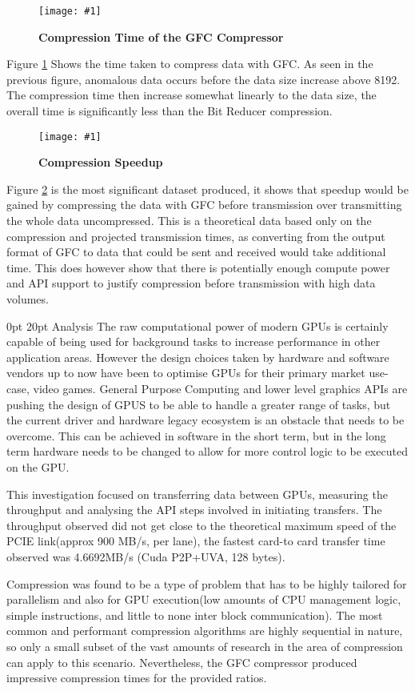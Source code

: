 \documentclass[12pt,a4paper]{article}
\makeatletter
\newcommand{\figuremacroWHN}[3]{
	\begin{figure}[h!] %
		\centering
		\texttt{[image: \#1]}
		\caption[#2]{\textbf{#2}}
		\label{fig:#1}
	\end{figure}
}
\renewcommand\section{\@startsection {section}{1}{0mm} %
                               {0pt} %
                               {20pt} %
                               {\fontsize{14pt}{1em}\bfseries\newpage}}
\makeatother
\begin{document}
\figuremacroWHN
{GFCCompressionTime}
{Compression Time of the GFC Compressor}
{1.0}

Figure \ref{fig:GFCCompressionTime} Shows the time taken to compress data with GFC. As seen in the previous figure, anomalous data occurs before the data size increase above 8192. The compression time then increase somewhat linearly to the data size, the overall time is significantly less than the Bit Reducer compression.

\figuremacroWHN
{GFCCompressionSpeedupvsDataSize}
{Compression Speedup}
{1.0}

Figure \ref{fig:GFCCompressionSpeedupvsDataSize} is the most significant dataset produced, it shows that speedup would be gained by compressing the data with GFC before transmission over transmitting the whole data uncompressed. This is a theoretical data based only on the compression and projected transmission times, as converting from the output format of GFC to data that could be sent and received would take additional time. This does however show that there is potentially enough compute power and API support to justify compression before transmission with high data volumes.

\section{Analysis}
The raw computational power of modern GPUs is certainly capable of being used for background tasks to increase performance in other application areas. However the design choices taken by hardware and software vendors up to now have been to optimise GPUs for their primary market use-case, video games. 
General Purpose Computing and lower level graphics APIs are pushing the design of GPUS to be able to handle a greater range of tasks, but the current driver and hardware legacy ecosystem is an obstacle that needs to be overcome. This can be achieved in software in the short term, but in the long term hardware needs to be changed to allow for more control logic to be executed on the GPU.

This investigation focused on transferring data between GPUs, measuring the throughput and analysing the API steps involved in initiating transfers. The throughput observed did not get close to the theoretical maximum speed of the PCIE link(approx 900 MB/s, per lane), the fastest card-to card transfer time observed was 4.6692MB/s (Cuda P2P+UVA, 128 bytes).

Compression was found to be a type of problem that has to be highly tailored for parallelism and also for GPU execution(low amounts of CPU  management logic, simple instructions, and little to none inter block communication). The most common and performant compression algorithms are highly sequential in nature, so only a small subset of the vast amounts of research in the area of compression can apply to this scenario. Nevertheless, the GFC compressor produced impressive compression times for the provided ratios. 
\end{document}
